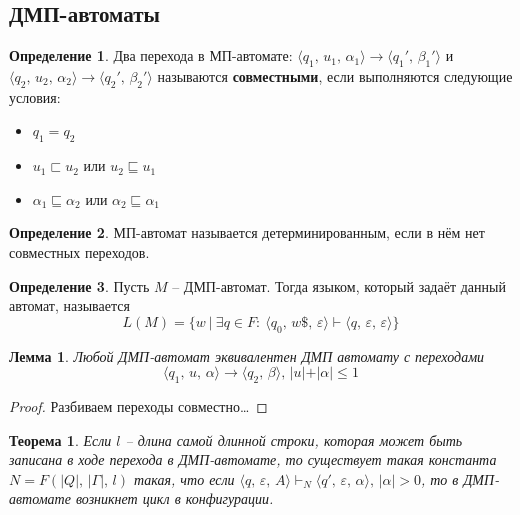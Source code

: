 \documentclass[a4paper,12pt]{article}
\renewcommand{\leq}{\ensuremath{\leqslant}}
\theoremstyle{plain}
\newtheorem{theorem}{Теорема}[subsection]
\newtheorem{lemma}{Лемма}[subsection]
\theoremstyle{definition}
\newtheorem{definition}{Определение}[subsection]
\theoremstyle{remark}
\begin{document}
\subsection{ДМП-автоматы}
\begin{definition}
	Два перехода в МП-автомате: $\langle q_1,\, u_1,\, \alpha_1\rangle \to \langle q_1',\, \beta_1'\rangle$ и $\langle q_2,\, u_2,\, \alpha_2\rangle \to \langle q_2',\, \beta_2'\rangle$ называются \textbf{совместными}, если выполняются следующие условия:
	\begin{itemize}
		\item $q_1 = q_2$
		\item $u_1 \sqsubset u_2$ или $u_2 \sqsubseteq u_1$
		\item $\alpha_1 \sqsubseteq \alpha_2$ или $\alpha_2 \sqsubseteq \alpha_1$
	\end{itemize}
\end{definition}

\begin{definition}
	МП-автомат называется детерминированным, если в нём нет совместных переходов.
\end{definition}

\begin{definition}
	Пусть $M$ -- ДМП-автомат. Тогда языком, который задаёт данный автомат, называется
	\[
		L(M) = \{w \:\vert\: \exists q \in F :\: \langle q_0,\,w\$,\,\varepsilon\rangle\vdash\langle q,\,\varepsilon,\,\varepsilon\rangle\}
	\]
\end{definition}

\begin{lemma}
	Любой ДМП-автомат эквивалентен ДМП автомату с переходами
	\[
		\langle q_1,\,u,\,\alpha\rangle\to\langle q_2,\,\beta\rangle,\, \vert u\vert +\vert \alpha\vert \leq 1
	\]
\end{lemma}

\begin{proof}
	Разбиваем переходы совместно\dots
\end{proof}

\begin{theorem}
	Если $l$ -- длина самой длинной строки, которая может быть записана в ходе перехода в ДМП-автомате, то существует такая константа $N = F(\vert Q\vert,\, \vert \Gamma\vert,\, l)$ такая, что если $\langle q,\,\varepsilon,\, A\rangle \vdash_N\langle q',\,\varepsilon,\, \alpha\rangle,\, \vert \alpha\vert > 0$, то в ДМП-автомате возникнет цикл в конфигурации.
\end{theorem}
\end{document}

